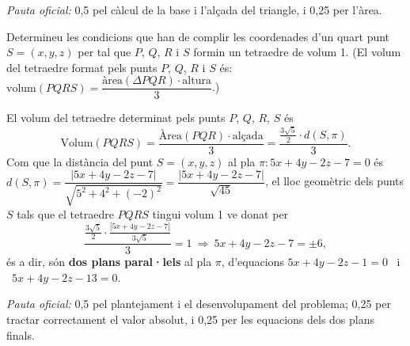 \begin{apartats}
\begin{solucio}
\textit{Pauta oficial:} 0,5 pel càlcul de la base i l'alçada del triangle, i 0,25 per l'àrea.
\end{solucio}

Determineu les condicions que han de complir les coordenades d'un quart punt $S=(x,y,z)$
per tal que $P$, $Q$, $R$ i $S$ formin un tetraedre de volum 1. (El volum del tetraedre
format pels punts $P$, $Q$, $R$ i $S$ és:
$\text{volum}(PQRS)=\dfrac{\text{àrea}(\Delta PQR)\cdot\text{altura}}{3}$.)

\begin{solucio}
El volum del tetraedre determinat pels punts $P$, $Q$, $R$, $S$ és
\[
\text{Volum}(PQRS)=\frac{\text{Àrea}(PQR)\cdot\text{alçada}}{3}=\frac{\frac{3\sqrt5}{2}\cdot d(S,\pi)}{3}.
\]
Com que la distància del punt $S=(x,y,z)$ al pla $\pi\colon 5x+4y-2z-7=0$ és
$d(S,\pi)=\dfrac{|5x+4y-2z-7|}{\sqrt{5^2+4^2+(-2)^2}}=\dfrac{|5x+4y-2z-7|}{\sqrt{45}}$,
el lloc geomètric dels punts $S$ tals que el tetraedre $PQRS$ tingui volum 1 ve donat per
\[
\frac{\frac{3\sqrt5}{2}\cdot\frac{|5x+4y-2z-7|}{3\sqrt5}}{3}=1
\ \Longrightarrow\ 5x+4y-2z-7=\pm6,
\]
és a dir, són \textbf{dos plans paral·lels} al pla $\pi$, d'equacions
$5x+4y-2z-1=0$ \ i \ $5x+4y-2z-13=0$.

\textit{Pauta oficial:} 0,5 pel plantejament i el desenvolupament del problema; 0,25 per
tractar correctament el valor absolut, i 0,25 per les equacions dels dos plans finals.
\end{solucio}

\end{apartats}
